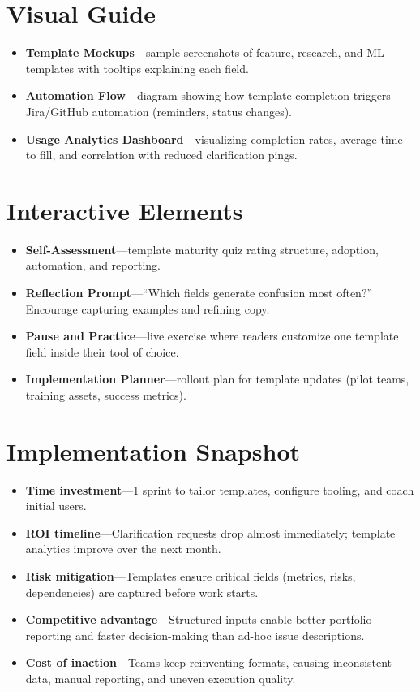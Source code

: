 \section{Visual Guide}
\label{sec:templates-visuals}
\begin{itemize}
    \item \textbf{Template Mockups}—sample screenshots of feature, research, and ML templates with tooltips explaining each field.
    \item \textbf{Automation Flow}—diagram showing how template completion triggers Jira/GitHub automation (reminders, status changes).
    \item \textbf{Usage Analytics Dashboard}—visualizing completion rates, average time to fill, and correlation with reduced clarification pings.
\end{itemize}

\section{Interactive Elements}
\label{sec:templates-interactive}
\begin{itemize}
    \item \textbf{Self-Assessment}—template maturity quiz rating structure, adoption, automation, and reporting.
    \item \textbf{Reflection Prompt}—``Which fields generate confusion most often?'' Encourage capturing examples and refining copy.
    \item \textbf{Pause and Practice}—live exercise where readers customize one template field inside their tool of choice.
    \item \textbf{Implementation Planner}—rollout plan for template updates (pilot teams, training assets, success metrics).
\end{itemize}
\section{Implementation Snapshot}
\label{sec:templates-snapshot}
\begin{itemize}
    \item \textbf{Time investment}—1 sprint to tailor templates, configure tooling, and coach initial users.
    \item \textbf{ROI timeline}—Clarification requests drop almost immediately; template analytics improve over the next month.
    \item \textbf{Risk mitigation}—Templates ensure critical fields (metrics, risks, dependencies) are captured before work starts.
    \item \textbf{Competitive advantage}—Structured inputs enable better portfolio reporting and faster decision-making than ad-hoc issue descriptions.
    \item \textbf{Cost of inaction}—Teams keep reinventing formats, causing inconsistent data, manual reporting, and uneven execution quality.
\end{itemize}
